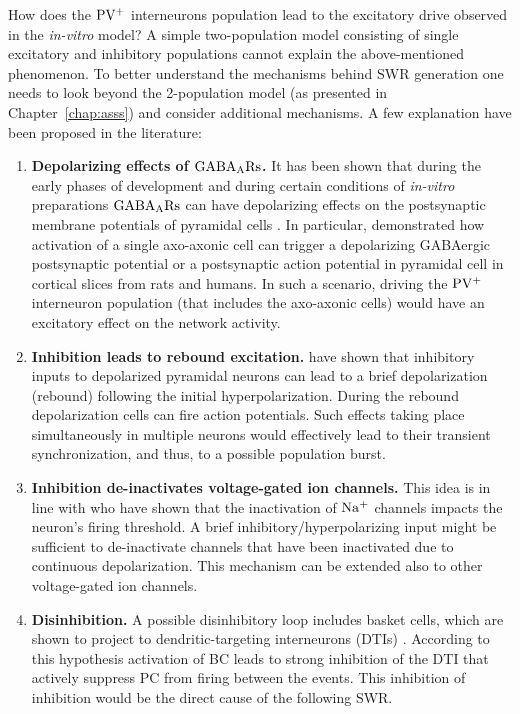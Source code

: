     How does the $\rm PV^+$ interneurons population lead to the excitatory
    drive observed in the {\it in-vitro} model? A simple two-population model
    consisting of single excitatory and inhibitory populations cannot explain
    the above-mentioned phenomenon. To better understand the mechanisms behind
    SWR generation one needs to look beyond the 2-population model (as
    presented in Chapter~\ref{chap:asss}) and consider additional
    mechanisms. A few explanation have been proposed in the literature:
    \begin{enumerate}
      \item \textbf{Depolarizing effects of $\rm GABA_ARs$.} It has been shown
        that during the early phases of development and during certain
        conditions of {\it in-vitro} preparations $\rm GABA_ARs$ can have
        depolarizing effects on the postsynaptic membrane potentials of
        pyramidal cells \citep{Cohen2002, Gulledge2003, Banke2006}. In
        particular, \cite{Szabadics2006} demonstrated how activation of a
        single axo-axonic cell can trigger a depolarizing GABAergic
        postsynaptic potential or a postsynaptic action potential in pyramidal
        cell in cortical slices from rats and humans. In such a scenario,
        driving the $\rm PV^+$ interneuron population (that includes the
        axo-axonic cells) would have an excitatory effect on the network
        activity.
      \item \textbf{Inhibition leads to rebound excitation.} \cite{Cobb1995}
        have shown that inhibitory inputs to depolarized pyramidal neurons can
        lead to a brief depolarization (rebound) following the initial
        hyperpolarization. During the rebound depolarization cells can fire
        action potentials. Such effects taking place simultaneously in multiple
        neurons would effectively lead to their transient synchronization, and
        thus, to a possible population burst.
      \item \textbf{Inhibition de-inactivates voltage-gated ion channels.} This
        idea is in line with \cite{Platkiewicz2011} who have shown that the
        inactivation of $\rm Na^+$ channels impacts the neuron's firing
        threshold. A brief inhibitory/hyperpolarizing input might be sufficient
        to de-inactivate channels that have been inactivated due to continuous
        depolarization. This mechanism can be extended also to other
        voltage-gated ion channels. 
      \item \textbf{Disinhibition.} A possible disinhibitory loop includes
        basket cells, which are shown to project to dendritic-targeting
        interneurons (DTIs) \citep{Cobb1997, Kohus2016}. According to this
        hypothesis activation of BC leads to strong inhibition of the DTI that
        actively suppress PC from firing between the events. This inhibition of
        inhibition would be the direct cause of the following SWR.
    \end{enumerate}
    
